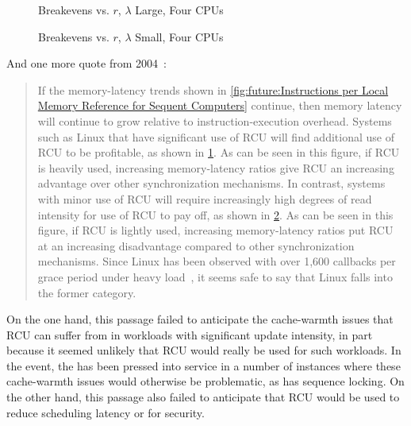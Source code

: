 \begin{figure}[htbp]
\centering
\epsfxsize=3in
\caption{Breakevens vs. $r$, $\lambda$ Large, Four CPUs}
\label{fig:future:Breakevens vs. r; lambda Large; Four CPUs}
\end{figure}

\begin{figure}[htbp]
\centering
\epsfxsize=3in
\caption{Breakevens vs. $r$, $\lambda$ Small, Four CPUs}
\label{fig:future:Breakevens vs. r; Worst-Case lambda; Four CPUs}
\end{figure}

And one more quote from 2004~\cite{PaulEdwardMcKenneyPhD}:

\begin{quote}
	If the memory-latency trends shown in
	\cref{fig:future:Instructions per Local Memory Reference for Sequent Computers}
	continue, then memory latency will continue to grow relative
	to instruction-execution overhead.
	Systems such as Linux that have significant use of RCU will find
	additional use of RCU to be profitable, as shown in
	\cref{fig:future:Breakevens vs. r; lambda Large; Four CPUs}.
	As can be seen in this figure, if RCU is heavily used, increasing
	memory-latency ratios give RCU an increasing advantage over other
	synchronization mechanisms.
	In contrast, systems with minor
	use of RCU will require increasingly high degrees of read intensity
	for use of RCU to pay off, as shown in
	\cref{fig:future:Breakevens vs. r; Worst-Case lambda; Four CPUs}.
	As can be seen in this figure, if RCU is lightly used,
	increasing memory-latency ratios
	put RCU at an increasing disadvantage compared to other synchronization
	mechanisms.
	Since Linux has been observed with over 1,600 callbacks per grace
	period under heavy load~\cite{Sarma04c},
	it seems safe to say that Linux falls into the former category.
\end{quote}

On the one hand, this passage failed to anticipate the cache-warmth
issues that RCU can suffer from in workloads with significant update
intensity, in part because it seemed unlikely that RCU would really
be used for such workloads.
In the event, the  has been pressed into
service in a number of instances where these cache-warmth issues would
otherwise be problematic, as has sequence locking.
On the other hand, this passage also failed to anticipate that
RCU would be used to reduce scheduling latency or for security.


